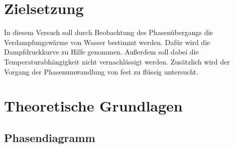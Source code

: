 \section{Zielsetzung}

In diesem Versuch soll durch Beobachtung des Phasenübergangs die 
Verdampfungswärme von Wasser bestimmt werden. Dafür wird die Dampfdruckkurve zu Hilfe genommen.
Außerdem soll dabei die Temperaturabhängigkeit nicht vernachlässigt werden.
Zusätzlich wird der Vorgang der Phasenumwandlung von fest zu flüssig untersucht.
\section{Theoretische Grundlagen}

\subsection{Phasendiagramm}

